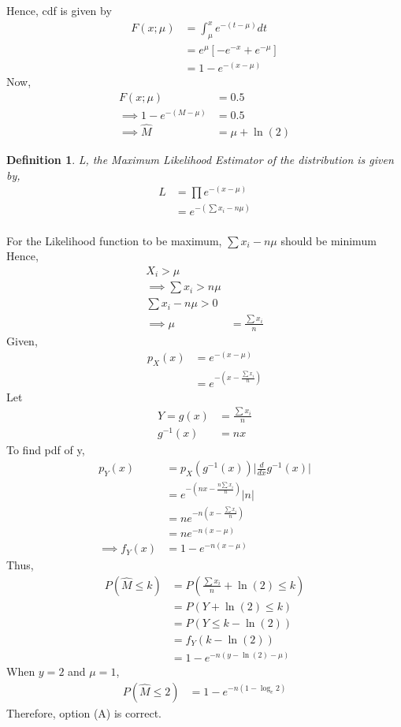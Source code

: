 \documentclass[]{article}
\newtheorem{definition}[problem]{Definition}
\theoremstyle{remark}
\begin{document}
Hence, cdf is given by
\begin{align}
F(x; \mu) &= \int_{\mu}^{x} e^{-(t-\mu)}dt\\ 
&= e^{\mu}[-e^{-x} + e^{-\mu}]\\
&= 1 - e^{-(x-\mu)}
\end{align}
Now,
\begin{align}
F(x; \mu) &= 0.5\\
\implies 1 - e^{-(M-\mu)} &= 0.5\\
\implies \hat{M} &= \mu + \ln(2)
\label{eq:39}
\end{align}
\begin{definition}
L, the Maximum Likelihood Estimator of the distribution is given by,
\begin{align}
L &= \prod e^{-(x-\mu)}\\
&= e^{-(\sum x_i-n\mu)}\\
\end{align}
\end{definition}
For the Likelihood function to be maximum,
$\sum x_i-n\mu$ should be minimum
Hence,
\begin{align}
X_i > \mu\\
\implies \sum x_i > n\mu\\
\sum x_i-n\mu > 0\\
\implies \mu &= \frac{\sum x_i}{n}
\end{align}
Given,
\begin{align}
p_X(x) &= e^{-(x-\mu)}\\
&= e^{-(x-\frac{\sum x_i}{n})}
\end{align}
Let
\begin{align}
Y = g(x) &= \frac{\sum x_i}{n}\\
g^{-1}(x) &= nx
\end{align}
To find pdf of y,
\begin{align}
p_Y(x) &= p_X(g^{-1}(x)) \lvert \frac{d}{dx} g^{-1}(x) \lvert \\
&= e^{-(nx-\frac{n \sum x_i}{n})} \lvert n \lvert \\
&= ne^{-n(x-\frac{\sum x_i}{n})}\\
&= ne^{-n(x-\mu)}\\
\implies f_Y(x) &= 1-e^{-n(x-\mu)}
\end{align}
Thus,
\begin{align}
P(\hat{M} \leq k) &= P(\frac{\sum x_i}{n} + \ln(2) \leq k)\\
&= P(Y + \ln(2) \leq k)\\
&= P(Y \leq k - \ln(2))\\
&= f_Y(k-\ln(2))\\
&= 1-e^{-n(y-\ln(2)-\mu)}
\end{align}
When $y = 2$ and $\mu = 1$,
\begin{align}
P(\hat{M} \leq 2) &= 1 - e^{-n(1 - \log_e 2)}
\end{align}
Therefore, option (A) is correct.
\end{document}
